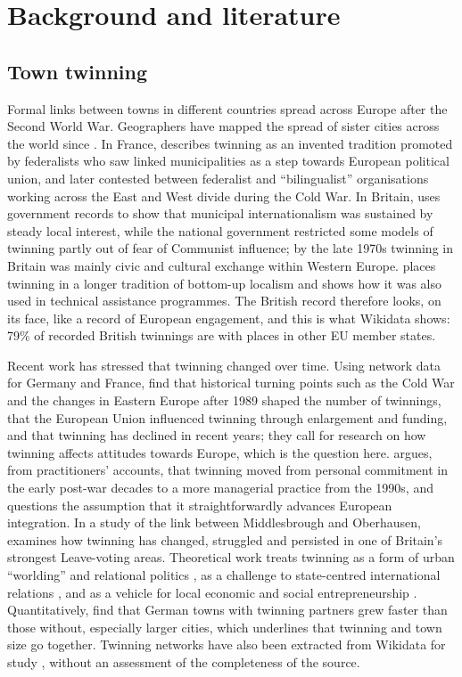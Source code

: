 \documentclass[11pt,a4paper]{article}
\begin{document}
\section{Background and literature}\label{sec:lit}
\subsection{Town twinning}
Formal links between towns in different countries spread across Europe after the Second World War. Geographers have mapped the spread of sister cities across the world since \citet{zelinsky1991}. In France, \citet{vion2002} describes twinning as an invented tradition promoted by federalists who saw linked municipalities as a step towards European political union, and later contested between federalist and ``bilingualist'' organisations working across the East and West divide during the Cold War. In Britain, \citet{clarke2010} uses government records to show that municipal internationalism was sustained by steady local interest, while the national government restricted some models of twinning partly out of fear of Communist influence; by the late 1970s twinning in Britain was mainly civic and cultural exchange within Western Europe. \citet{clarke2009} places twinning in a longer tradition of bottom-up localism and shows how it was also used in technical assistance programmes. The British record therefore looks, on its face, like a record of European engagement, and this is what Wikidata shows: 79\% of recorded British twinnings are with places in other EU member states.

Recent work has stressed that twinning changed over time. Using network data for Germany and France, \citet{falkenhain2012} find that historical turning points such as the Cold War and the changes in Eastern Europe after 1989 shaped the number of twinnings, that the European Union influenced twinning through enlargement and funding, and that twinning has declined in recent years; they call for research on how twinning affects attitudes towards Europe, which is the question here. \citet{langenohl2023} argues, from practitioners' accounts, that twinning moved from personal commitment in the early post-war decades to a more managerial practice from the 1990s, and questions the assumption that it straightforwardly advances European integration. In a study of the link between Middlesbrough and Oberhausen, \citet{warwick2024} examines how twinning has changed, struggled and persisted in one of Britain's strongest Leave-voting areas. Theoretical work treats twinning as a form of urban ``worlding'' and relational politics \citep{jayne2011}, as a challenge to state-centred international relations \citep{joenniemi2017}, and as a vehicle for local economic and social entrepreneurship \citep{cremer2001}. Quantitatively, \citet{brakman2016} find that German towns with twinning partners grew faster than those without, especially larger cities, which underlines that twinning and town size go together. Twinning networks have also been extracted from Wikidata for study \citep{seth2018}, without an assessment of the completeness of the source.
\end{document}
